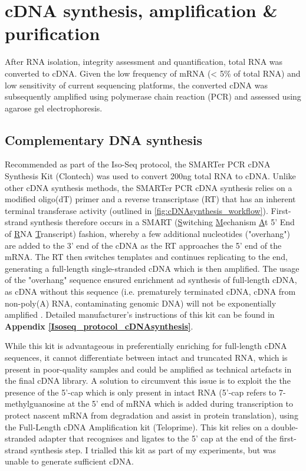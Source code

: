 \begin{figure}[htp]
	\label{fig:bionalayzer_pics}
\end{figure}

\newpage
\section{cDNA synthesis, amplification \& purification}
After RNA isolation, integrity assessment and quantification, total RNA was converted to cDNA. Given the low frequency of mRNA (< 5\% of total RNA) and low sensitivity of current sequencing platforms, the converted cDNA was subsequently amplified using polymerase chain reaction (PCR) and assessed using agarose gel electrophoresis. 


\subsection{Complementary DNA synthesis}
\label{section:ch2_cDNA_synthesis_explanation} 
Recommended as part of the Iso-Seq protocol, the SMARTer PCR cDNA Synthesis Kit (Clontech) was used to convert 200ng total RNA to cDNA. Unlike other cDNA synthesis methods, the SMARTer PCR cDNA synthesis relies on a modified oligo(dT) primer and a reverse transcriptase (RT) that has an inherent terminal transferase activity (outlined in \cref{fig:cDNAsynthesis_workflow}). First-strand synthesis therefore occurs in a SMART (\underline{S}witching \underline{M}echanism \underline{A}t 5' End of \underline{R}NA \underline{T}ranscript) fashion, whereby a few additional nucleotides ("overhang") are added to the 3' end of the cDNA as the RT approaches the 5' end of the mRNA. The RT then switches templates and continues replicating to the end, generating a full-length single-stranded cDNA which is then amplified. The usage of the "overhang" sequence ensured enrichment ad synthesis of full-length cDNA, as cDNA without this sequence (i.e. prematurely terminated cDNA, cDNA from non-poly(A) RNA, contaminating genomic DNA) will not be exponentially amplified \cite{Ramskold2012}. Detailed manufacturer's instructions of this kit can be found in \textbf{Appendix \ref{Isoseq_protocol_cDNAsynthesis}}. 

While this kit is advantageous in preferentially enriching for full-length cDNA sequences, it cannot differentiate between intact and truncated RNA, which is present in poor-quality samples and could be amplified as technical artefacts in the final cDNA library. A solution to circumvent this issue is to exploit the the presence of the 5’-cap which is only present in intact RNA (5'-cap refers to 7-methylguanosine at the 5’ end of mRNA which is added during transcription to protect nascent mRNA from degradation and assist in protein translation), using the Full-Length cDNA Amplification kit (Teloprime)\cite{Cartolano2016}. This kit relies on a double-stranded adapter that recognises and ligates to the 5’ cap at the end of the first-strand synthesis step. I trialled this kit as part of my experiments, but was unable to generate sufficient cDNA. 

